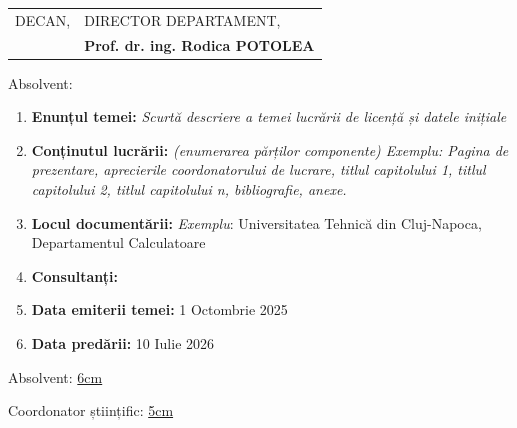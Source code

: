 \begin{tabular}{p{7cm}p{8cm}}
	\hspace{-1cm}DECAN, & DIRECTOR DEPARTAMENT,\\
	\hspace{-1cm}{\bf Prof. dr. ing. Vlad MUREȘAN} & {\bf Prof. dr. ing. Rodica POTOLEA}\\  
\end{tabular}

\vspace{2cm}

\begin{center}
	Absolvent: {\bf \thesisauthor}
	
	\vspace{1cm}
	
	{\bf \thesistitle}
\end{center}

\vspace{5mm}
\begin{enumerate}
	\item {\bf Enunțul temei:} {\it Scurtă descriere a temei lucrării de licență și datele inițiale}
	\item {\bf Conținutul lucrării:} {\it (enumerarea părților componente) Exemplu: Pagina de prezentare, aprecierile coordonatorului de lucrare, titlul capitolului 1, titlul capitolului 2, titlul capitolului n, bibliografie, anexe.}
	\item {\bf Locul documentării:} {\it Exemplu}: Universitatea Tehnică din Cluj-Napoca, Departamentul Calculatoare
	\item {\bf Consultanți:}
	\item {\bf Data emiterii temei:} 1 Octombrie 2025 %
	\item {\bf Data predării:} 10 Iulie 2026 %
\end{enumerate}
\vspace{1.2cm}

\hspace{6cm} Absolvent: \uline{6cm} 

\vspace{0.5cm}
\hspace{6cm} Coordonator științific: \uline{5cm} 
\newpage
\begin{center}
	{\department}
\end{center}
\vspace{0.5cm}

